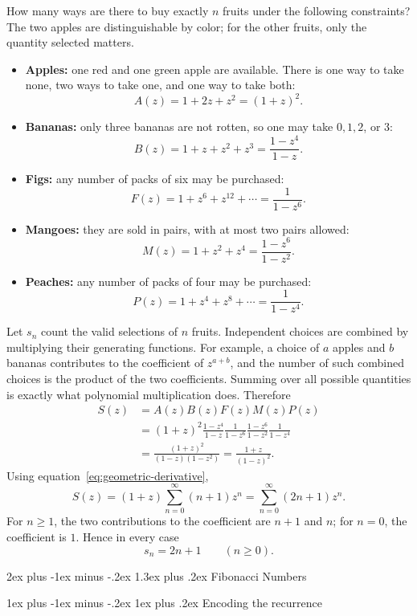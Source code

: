 \documentclass[11pt]{article}
\makeatletter
\renewcommand{\section}{\@startsection{section}{1}{0mm}%
                                   {2ex plus -1ex minus -.2ex}%
                                   {1.3ex plus .2ex}%
                                   {\normalfont\Large\bfseries}}%
\renewcommand{\subsection}{\@startsection{subsection}{2}{0mm}%
                                     {1ex plus -1ex minus -.2ex}%
                                     {1ex plus .2ex}%
                                     {\normalfont\large\bfseries}}%
\makeatother
\begin{document}
How many ways are there to buy exactly $n$ fruits under the following constraints?
The two apples are distinguishable by color; for the other fruits, only the
quantity selected matters.
\begin{itemize}
 \item \textbf{Apples:} one red and one green apple are available. There is one
 way to take none, two ways to take one, and one way to take both:
 \[
  A(z)=1+2z+z^2=(1+z)^2.
 \]
 \item \textbf{Bananas:} only three bananas are not rotten, so one may take
 $0,1,2$, or $3$:
 \[
  B(z)=1+z+z^2+z^3=\frac{1-z^4}{1-z}.
 \]
 \item \textbf{Figs:} any number of packs of six may be purchased:
 \[
  F(z)=1+z^6+z^{12}+\cdots=\frac{1}{1-z^6}.
 \]
 \item \textbf{Mangoes:} they are sold in pairs, with at most two pairs allowed:
 \[
  M(z)=1+z^2+z^4=\frac{1-z^6}{1-z^2}.
 \]
 \item \textbf{Peaches:} any number of packs of four may be purchased:
 \[
  P(z)=1+z^4+z^8+\cdots=\frac{1}{1-z^4}.
 \]
\end{itemize}

Let $s_n$ count the valid selections of $n$ fruits. Independent choices are
combined by multiplying their generating functions. For example, a choice of
$a$ apples and $b$ bananas contributes to the coefficient of $z^{a+b}$, and
the number of such combined choices is the product of the two coefficients.
Summing over all possible quantities is exactly what polynomial multiplication
does. Therefore
\begin{align*}
 S(z)&=A(z)B(z)F(z)M(z)P(z)\\
 &= (1+z)^2\frac{1-z^4}{1-z}\frac{1}{1-z^6}
       \frac{1-z^6}{1-z^2}\frac{1}{1-z^4}\\
 &=\frac{(1+z)^2}{(1-z)(1-z^2)}
  =\frac{1+z}{(1-z)^2}.
\end{align*}
Using equation~\eqref{eq:geometric-derivative},
\[
 S(z)=(1+z)\sum_{n=0}^{\infty}(n+1)z^n
     =\sum_{n=0}^{\infty}(2n+1)z^n.
\]
For $n\geq 1$, the two contributions to the coefficient are $n+1$ and $n$;
for $n=0$, the coefficient is $1$. Hence in every case
\[
 \boxed{s_n=2n+1\qquad(n\geq 0).}
\]

\section{Fibonacci Numbers}

\subsection{Encoding the recurrence}
\end{document}
